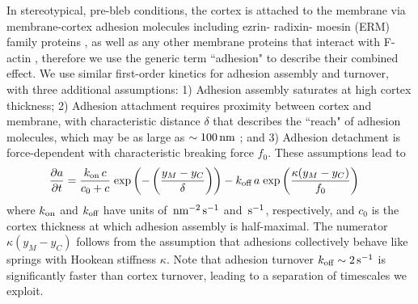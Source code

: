 In stereotypical, pre-bleb conditions, the cortex is attached to the membrane via membrane-cortex adhesion molecules including ezrin- radixin- moesin (ERM) family proteins \cite{Fritzsche:2014jw}, as well as any other membrane proteins that interact with F-actin \cite{Paszek:2015it}, therefore we use the generic term ``adhesion" to describe their combined effect. We use similar first-order kinetics for adhesion assembly and turnover, with three additional assumptions: 1) Adhesion assembly saturates at high cortex thickness; 2) Adhesion attachment requires proximity between cortex and membrane, with characteristic distance $\delta$ that describes the ``reach" of adhesion molecules, which may be as large as $\sim100\,\mbox{nm}$ \cite{Clark:2013ef}; and 3) Adhesion detachment is force-dependent with characteristic breaking force $f_0$. These assumptions lead to
\begin{align}
\frac{\partial a}{\partial t} &=  \frac{k_{\mbox{\scriptsize on}}\,c}{c_0+c}\; \mbox{exp}\left( - \left(\frac{y_M-y_C}{\delta}\right)\right) - k_{\mbox{\scriptsize off}}\, a\; \mbox{exp}\left( \frac{\kappa (y_M-y_C)}{f_0}\right) \label{eq::adhesionKinetics}
\end{align}
where $k_{\mbox{\scriptsize on}}$ and $k_{\mbox{\scriptsize off}}$ have units of $\,\mbox{nm}^{-2} \,\mbox{s}^{-1}$ and $\,\mbox{s}^{-1}$, respectively, and $c_0$ is the cortex thickness at which adhesion assembly is half-maximal. The numerator $\kappa (y_M-y_C)$ follows from the assumption that adhesions collectively behave like springs with Hookean stiffness $\kappa$. Note that adhesion turnover $k_{\mbox{\scriptsize off}}\sim 2\,\mbox{s}^{-1}$ \cite{Fritzsche:2014jw} is significantly faster than cortex turnover, leading to a separation of timescales we exploit.

